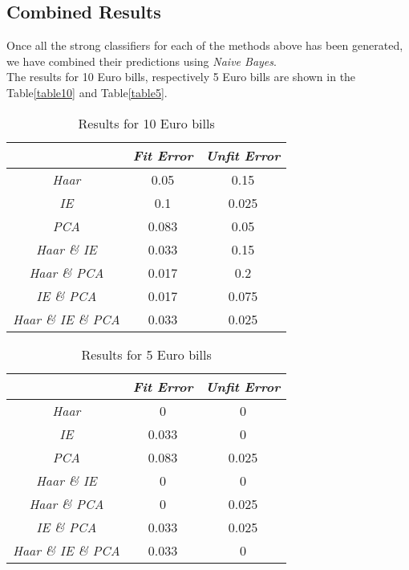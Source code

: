 \documentclass[11pt,twocolumn]{article}
\begin{document}
		\subsection{Combined Results}\label{sec:comb_results}
			\hspace*{10px}Once all the strong classifiers for each of the methods above
			has been generated, we have combined their predictions using \emph{Naive
			Bayes}.\\ 
			\hspace*{10px}The results for 10 Euro bills, respectively 5 Euro bills are
			shown in the Table\ref{table10} and Table\ref{table5}. 
			\begin{table}[!htbp]
				\caption{Results for 10 Euro bills}
				\selectfont\small
				\label{table10}
				\centering 
				\begin{tabular}{ | c | c | c|}
					\hline\hline & \emph{Fit Error} & \emph{Unfit Error} \\ [0.5ex]\hline 
					\emph{Haar} & 0.05 & 0.15 \\ [0.5ex]\hline
					\emph{IE} & 0.1 & 0.025 \\ [0.5ex]\hline
					\emph{PCA} & 0.083 & 0.05 \\ [0.5ex]\hline
					\emph{Haar \& IE} & 0.033 & 0.15 \\ [0.5ex]\hline
					\emph{Haar \& PCA} & 0.017 & 0.2 \\ [0.5ex]\hline
					\emph{IE \& PCA} & 0.017 & 0.075 \\ [0.5ex]\hline
					\emph{Haar \& IE \& PCA} & 0.033 & 0.025 \\ [0.5ex]\hline
				\end{tabular} 
				\label{table:nonlin10eur} 
			\end{table}		
			\begin{table}[!htbp]
				\caption{Results for 5 Euro bills}
				\selectfont\small
				\label{table5}
				\centering 
				\begin{tabular}{ | c | c | c|}
					\hline\hline & \emph{Fit Error} & \emph{Unfit Error} \\ [0.5ex]\hline 
					\emph{Haar} & 0 & 0 \\ [0.5ex]\hline
					\emph{IE} & 0.033 & 0 \\ [0.5ex]\hline
					\emph{PCA} & 0.083 & 0.025 \\ [0.5ex]\hline
					\emph{Haar \& IE} & 0 & 0 \\ [0.5ex]\hline
					\emph{Haar \& PCA} & 0 & 0.025 \\ [0.5ex]\hline
					\emph{IE \& PCA} & 0.033 & 0.025 \\ [0.5ex]\hline
					\emph{Haar \& IE \& PCA} & 0.033 & 0 \\ [0.5ex]\hline
				\end{tabular}
				\label{table:nonlin5eur} 
			\end{table}
\end{document}
